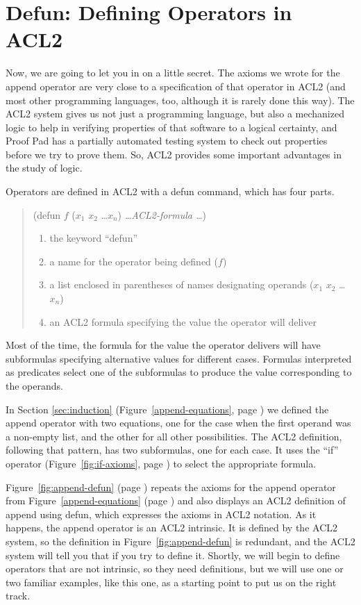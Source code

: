 \section{Defun: Defining Operators in ACL2}
\label{sec:defun}

Now, we are going to let you in on a little secret.
The axioms we wrote for the append operator are very
close to a specification of that operator in ACL2
(and most other programming languages, too, although
it is rarely done this way).
The ACL2 system gives us not just a programming language,
but also a mechanized logic to help in verifying properties of
that software to a logical certainty,
and Proof Pad has a partially automated testing system to
check out properties before we try to prove them.
So, ACL2 provides some important advantages in the study of logic.

Operators are defined in ACL2 with a defun command,
which has four parts.
\begin{quote}
(defun $f$ ($x_1$ $x_2$ \dots $x_n$) \emph{\dots ACL2-formula \dots})

\begin{enumerate}
\item the keyword ``defun''
\item a name for the operator being defined ($f$)
\item a list enclosed in parentheses of names designating operands ($x_1$ $x_2$ \dots $x_n$)
\item an ACL2 formula specifying the value the operator will deliver
\end{enumerate}
\end{quote}

Most of the time, the formula for the value the operator delivers
will have subformulas specifying alternative values for different cases.
Formulas interpreted as predicates select one of
the subformulas to produce the value corresponding to the operands.

In Section \ref{sec:induction} (Figure~\ref{append-equations}, page \pageref{append-equations})
we defined the append operator with two equations,
one for the case when the first operand was a non-empty list,
and the other for all other possibilities.
The ACL2 definition, following that pattern, has two subformulas,
one for each case.
It uses the ``if'' operator
(Figure~\ref{fig:if-axioms}, page \pageref{fig:if-axioms})
to select the appropriate formula.

Figure~\ref{fig:append-defun} (page \pageref{fig:append-defun})
repeats the axioms for the append operator from
Figure~\ref{append-equations} (page \pageref{append-equations})
and also displays an ACL2 definition of append using defun,
which expresses the axioms in ACL2 notation.
As it happens, the append operator is an ACL2 intrinsic.
It is defined by the ACL2 system, so the definition
in Figure~\ref{fig:append-defun} is redundant,
and the ACL2 system will tell you that if you try to define it.
Shortly, we will begin to define operators that are not
intrinsic, so they need definitions,
but we will use one or two familiar examples, like this one,
as a starting point to put us on the right track.

